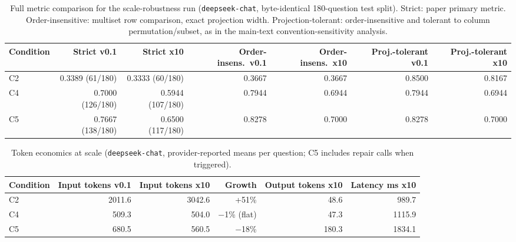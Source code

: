 \documentclass[11pt]{article}
\begin{document}
\begin{table}[htbp]
\caption{Full metric comparison for the scale-robustness run (\texttt{deepseek-chat}, byte-identical 180-question test split). Strict: paper primary metric. Order-insensitive: multiset row comparison, exact projection width. Projection-tolerant: order-insensitive and tolerant to column permutation/subset, as in the main-text convention-sensitivity analysis.}
\label{tab:sup-x10-metrics}
\centering
\small
\begin{adjustbox}{max width=\textwidth}
\begin{tabular}{lrrrrrr}
\toprule
\textbf{Condition} & \textbf{Strict v0.1} & \textbf{Strict x10} & \textbf{Order-insens.\ v0.1} & \textbf{Order-insens.\ x10} & \textbf{Proj.-tolerant v0.1} & \textbf{Proj.-tolerant x10} \\
\midrule
C2 & 0.3389 (61/180) & 0.3333 (60/180) & 0.3667 & 0.3667 & 0.8500 & 0.8167 \\
C4 & 0.7000 (126/180) & 0.5944 (107/180) & 0.7944 & 0.6944 & 0.7944 & 0.6944 \\
C5 & 0.7667 (138/180) & 0.6500 (117/180) & 0.8278 & 0.7000 & 0.8278 & 0.7000 \\
\bottomrule
\end{tabular}
\end{adjustbox}
\end{table}

\begin{table}[htbp]
\caption{Token economics at scale (\texttt{deepseek-chat}, provider-reported means per question; C5 includes repair calls when triggered).}
\label{tab:sup-x10-tokens}
\centering
\small
\begin{adjustbox}{max width=\textwidth}
\begin{tabular}{lrrrrr}
\toprule
\textbf{Condition} & \textbf{Input tokens v0.1} & \textbf{Input tokens x10} & \textbf{Growth} & \textbf{Output tokens x10} & \textbf{Latency ms x10} \\
\midrule
C2 & 2011.6 & 3042.6 & +51\% & 48.6 & 989.7 \\
C4 & 509.3 & 504.0 & $-$1\% (flat) & 47.3 & 1115.9 \\
C5 & 680.5 & 560.5 & $-$18\% & 180.3 & 1834.1 \\
\bottomrule
\end{tabular}
\end{adjustbox}
\end{table}
\end{document}
